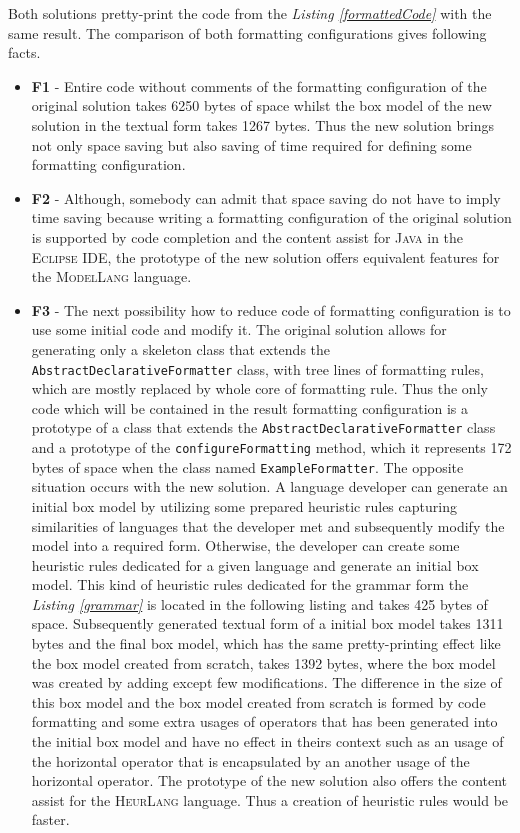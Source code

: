 \documentclass[12pt,notitlepage,a4paper]{report}
\begin{document}
Both solutions pretty-print the code from the \textit{Listing \ref{formattedCode}} with the same result. The comparison of both formatting configurations gives following facts.
\begin{itemize}
\item \textbf{F1} - Entire code without comments of the formatting configuration of the original solution takes 6250 bytes of space whilst the box model of the new solution in the textual form takes 1267 bytes. Thus the new solution brings not only space saving but also saving of time required for defining some formatting configuration. 
\item \textbf{F2} - Although, somebody can admit that space saving do not have to imply time saving because writing a formatting configuration of the original solution is supported by code completion and the content assist for \textsc{Java} in the \textsc{Eclipse IDE}, the prototype of the new solution offers equivalent features for the \textsc{ModelLang} language.
\item \textbf{F3} - The next possibility how to reduce code of formatting configuration is to use some initial code and modify it. The original solution allows for generating only a skeleton class that extends the \texttt{AbstractDeclarativeFormatter} class, with tree lines of formatting rules, which are mostly replaced by whole core of formatting rule. Thus the only code which will be contained in the result formatting configuration is a prototype of a class that extends the \texttt{AbstractDeclarativeFormatter} class and a prototype of the \texttt{configureFormatting} method, which it represents 172 bytes of space when the class named \texttt{ExampleFormatter}. The opposite situation occurs with the new solution.  A language developer can generate an initial box model by utilizing some prepared heuristic rules capturing similarities of languages that the developer met and subsequently modify the model into a required form. Otherwise, the developer can create some heuristic rules dedicated for a given language and generate an initial box model. This kind of heuristic rules dedicated for the grammar form the \textit{Listing \ref{grammar}} is located in the following listing and takes 425 bytes of space. Subsequently generated textual form of a initial box model takes 1311 bytes and the final box model, which has the same pretty-printing effect like the box model created from scratch, takes 1392 bytes, where the box model was created by adding except few modifications. The difference in the size of this box model and the box model created from scratch is formed by code formatting and some extra usages of operators that has been generated into the initial box model and have no effect in theirs context such as an usage of the horizontal operator that is encapsulated by an another usage of the horizontal operator. The prototype of the new solution also offers the content assist for the \textsc{HeurLang} language. Thus a creation of heuristic rules would be faster.

\end{itemize}
\end{document}
